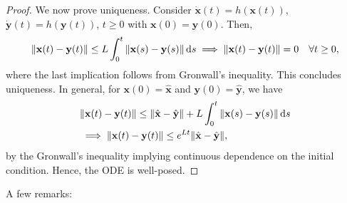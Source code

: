 \begin{proof}
    \medskip
    
    We now prove uniqueness. Consider $\dot{\mathbf{x}}(t) = h(\mathbf{x}(t))$, $\dot{\mathbf{y}}(t) = h(\mathbf{y}(t))$, $t \geq 0$ with $\mathbf{x}(0) = \mathbf{y}(0)$. Then,
    \[
        \norm{\mathbf{x}(t) - \mathbf{y}(t)} \leq L \int_0^t \norm{\mathbf{x}(s) - \mathbf{y}(s)} \, \mathrm{d} s \implies \norm{\mathbf{x}(t) - \mathbf{y}(t)} = 0 \quad \forall t \geq 0,
    \]
    where the last implication follows from Gronwall's inequality. This concludes uniqueness. In general, for $\mathbf{x}(0) = \hat{\mathbf{x}}$ and $\mathbf{y}(0) = \hat{\mathbf{y}}$, we have 
    \begin{align*}
        &\norm{\mathbf{x}(t) - \mathbf{y}(t)} \leq \norm{\hat{\mathbf{x}} - \hat{\mathbf{y}}} + L \int_0^t \norm{\mathbf{x}(s) - \mathbf{y}(s)} \, \mathrm{d} s \\
        &\implies \norm{\mathbf{x}(t) - \mathbf{y}(t)} \leq e^{Lt} \norm{\hat{\mathbf{x}} - \hat{\mathbf{y}}},
    \end{align*}
    by the Gronwall's inequality implying continuous dependence on the initial condition. Hence, the ODE is well-posed.
\end{proof}

A few remarks:

